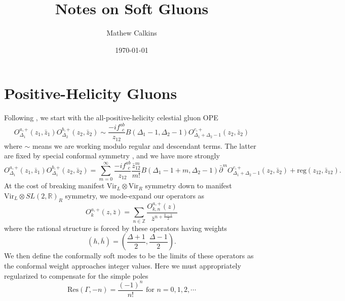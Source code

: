 \documentclass[11pt,letterpaper]{article}
\newcommand{\LP}{\left(}
\newcommand{\RP}{\right)}
\newcommand{\R}{\mathbb{R}}
\newcommand{\Z}{\mathbb{Z}}
\newcommand{\D}{\partial}
\begin{document}
\title{Notes on Soft Gluons}

\author{Mathew Calkins}

\date{\today}

 
\maketitle




\section{Positive-Helicity Gluons}
Following \cite{Guevara:2021abz}, we start with the all-positive-helicity celestial gluon OPE \begin{equation}\label{allplusgluonope}
O_{\Delta_1}^{a,+}(z_1, \bar{z}_1) O_{\Delta_2}^{b,+}(z_2, \bar{z}_2) \sim \frac{-i f^{ab}_{ \ \ c}}{z_{12}} B(\Delta_1 - 1, \Delta_2 - 1) O_{\Delta_1 + \Delta_2 - 1}^{c,+}(z_2, \bar{z}_2) 
\end{equation}
where $\sim$ means we are working modulo regular and descendant terms. The latter are fixed by special conformal symmetry \cite{Himwich:2021dau}, and we have more strongly \begin{equation}
O_{\Delta_1}^{a,+}(z_1, \bar{z}_1) O_{\Delta_1}^{b,+}(z_2, \bar{z}_2) = \sum_{m=0}^\infty \frac{-i f^{ab}_{ \ \ c}}{z_{12}} \frac{\bar{z}_{12}^m}{m!} B(\Delta_1 - 1 + m , \Delta_2 - 1) \bar{\D}^m O_{\Delta_1 + \Delta_2 - 1}^{c,+}(z_2, \bar{z}_2) + \mbox{reg}(z_{12}, \bar{z}_{12}). 
\end{equation} 
At the cost of breaking manifest $\mbox{Vir}_L \otimes \mbox{Vir}_R$ symmetry down to manifest $\mbox{Vir}_L \otimes SL(2,\R)_R$ symmetry, we mode-expand our operators as \begin{equation}
O^{a,+}_k(z, \bar{z}) = \sum_{n \in \Z} \frac{O^{a,+}_{k,n}(z)}{\bar{z}^{n + \frac{k-1}{2}}}
\end{equation}
where the rational structure is forced by these operators having weights \begin{equation}
\LP h, \overline{h} \RP = \LP \frac{\Delta + 1}{2}, \frac{\Delta - 1}{2} \RP.
\end{equation}
We then define the conformally soft modes to be the limits of these operators as the conformal weight approaches integer values. Here we must appropriately regularized to compensate for the simple poles \begin{equation}
\mbox{Res}(\Gamma, -n) = \frac{(-1)^n}{n!} \mbox{ for } n = 0, 1, 2, \cdots 
\end{equation}
\end{document}
